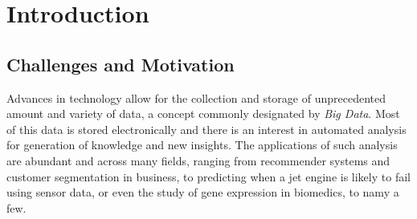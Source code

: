 \chapter{Introduction}
\label{chapter:introduction}


\section{Challenges and Motivation}

 



Advances in technology allow for the collection and storage of unprecedented amount and variety of data, a concept commonly designated by \emph{Big Data}.
Most of this data is stored electronically and there is an interest in automated analysis for generation of knowledge and new insights.
The applications of such analysis are abundant and across many fields, ranging from recommender systems and customer segmentation in business, to predicting when a jet engine is likely to fail using sensor data, or even the study of gene expression in biomedics, to namy a few.

